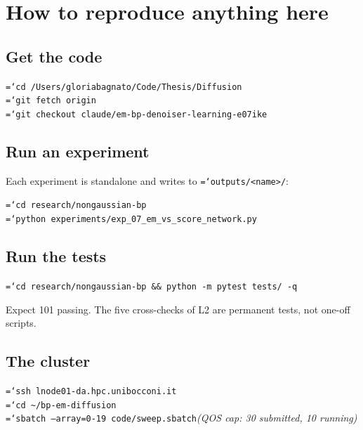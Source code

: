 \documentclass[11pt,a4paper]{article}
\newcommand{\code}[1]{\texttt{\small\hyphenchar\font=`\-\relax #1}}
\begin{document}
\newpage
\section{How to reproduce anything here}

\subsection{Get the code}

\begin{keybox}
\code{cd /Users/gloriabagnato/Code/Thesis/Diffusion}\\
\code{git fetch origin}\\
\code{git checkout claude/em-bp-denoiser-learning-e07ike}
\end{keybox}

\subsection{Run an experiment}

Each experiment is standalone and writes to \code{outputs/<name>/}:

\begin{keybox}
\code{cd research/nongaussian-bp}\\
\code{python experiments/exp\_07\_em\_vs\_score\_network.py}
\end{keybox}

\subsection{Run the tests}

\begin{keybox}
\code{cd research/nongaussian-bp \&\& python -m pytest tests/ -q}
\end{keybox}

\noindent
Expect 101 passing. The five cross-checks of L2 are permanent tests, not one-off scripts.

\subsection{The cluster}

\begin{keybox}
\code{ssh lnode01-da.hpc.unibocconi.it}\\
\code{cd \textasciitilde/bp-em-diffusion}\\
\code{sbatch --array=0-19 code/sweep.sbatch}\quad\emph{(QOS cap: 30 submitted, 10 running)}
\end{keybox}
\end{document}
